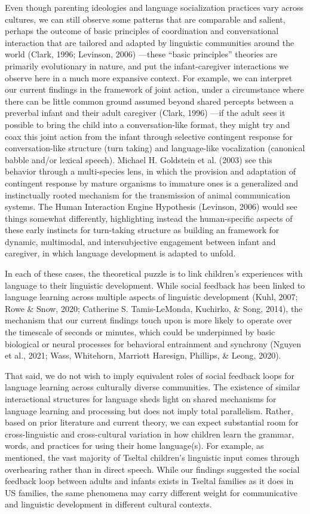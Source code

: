 \documentclass[
  man]{apa6}
\begin{document}
Even though parenting ideologies and language socialization practices vary across cultures, we can still observe some patterns that are comparable and salient, perhaps the outcome of basic principles of coordination and conversational interaction that are tailored and adapted by linguistic communities around the world (Clark, 1996; Levinson, 2006) ---these ``basic principles'' theories are primarily evolutionary in nature, and put the infant-caregiver interactions we observe here in a much more expansive context. For example, we can interpret our current findings in the framework of joint action, under a circumstance where there can be little common ground assumed beyond shared percepts between a preverbal infant and their adult caregiver (Clark, 1996) ---if the adult sees it possible to bring the child into a conversation-like format, they might try and coax this joint action from the infant through selective contingent response for conversation-like structure (turn taking) and language-like vocalization (canonical babble and/or lexical speech). Michael H. Goldstein et al. (2003) see this behavior through a multi-species lens, in which the provision and adaptation of contingent response by mature organisms to immature ones is a generalized and instinctually rooted mechanism for the transmission of animal communication systems. The Human Interaction Engine Hypothesis (Levinson, 2006) would see things somewhat differently, highlighting instead the human-specific aspects of these early instincts for turn-taking structure as building an framework for dynamic, multimodal, and intersubjective engagement between infant and caregiver, in which language development is adapted to unfold.

In each of these cases, the theoretical puzzle is to link children's experiences with language to their linguistic development. While social feedback has been linked to language learning across multiple aspects of linguistic development (Kuhl, 2007; Rowe \& Snow, 2020; Catherine S. Tamis-LeMonda, Kuchirko, \& Song, 2014), the mechanism that our current findings touch upon is more likely to operate over the timescale of seconds or minutes, which could be underpinned by basic biological or neural processes for behavioral entrainment and synchrony (Nguyen et al., 2021; Wass, Whitehorn, Marriott Haresign, Phillips, \& Leong, 2020).

That said, we do not wish to imply equivalent roles of social feedback loops for language learning across culturally diverse communities. The existence of similar interactional structures for language sheds light on shared mechanisms for language learning and processing but does not imply total parallelism. Rather, based on prior literature and current theory, we can expect substantial room for cross-linguistic and cross-cultural variation in how children learn the grammar, words, and practices for using their home language(s). For example, as mentioned, the vast majority of Tseltal children's linguistic input comes through overhearing rather than in direct speech. While our findings suggested the social feedback loop between adults and infants exists in Tseltal families as it does in US families, the same phenomena may carry different weight for communicative and linguistic development in different cultural contexts.
\end{document}
